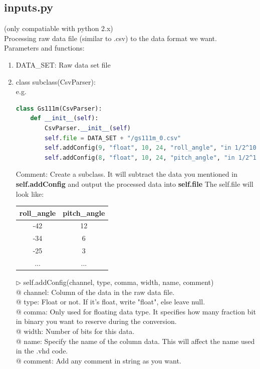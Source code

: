 \subsection{inputs.py}\label{inputs.py}
(only compatiable with python 2.x)\\
Processing raw data file (similar to .csv) to the data format we want.\\
Parameters and functions:
\begin{enumerate}
	\item DATA\_SET: Raw data set file
	\item class subclass(CsvParser): \\
e.g.
\begin{lstlisting}[language=Python]
class Gs111m(CsvParser):
	def __init__(self):
		CsvParser.__init__(self)
		self.file = DATA_SET + "/gs111m_0.csv"
		self.addConfig(9, "float", 10, 24, "roll_angle", "in 1/2^10 rad")
		self.addConfig(8, "float", 10, 24, "pitch_angle", "in 1/2^10 rad")
\end{lstlisting}
Comment: Create a subclass. It will subtract the data you mentioned in \textbf{self.addConfig} and output the processed data into \textbf{self.file}
The self.file will look like:
\begin{center}
\begin{tabular}{ c|c}
 \hline
 roll\_angle & pitch\_angle \\
 \hline
 -42 & 12 \\
 \hline
 -34 & 6\\
 \hline
 -25 & 3\\
 ...&...
\end{tabular}
\end{center}
$\triangleright$ self.addConfig(channel, type, comma, width, name, comment)\\
@ channel: Column of the data in the raw data file.\\
@ type: Float or not. If it's float, write "float", else leave null.\\
@ comma: Only used for floating data type. It specifies how many fraction bit in binary you want to reserve during the conversion.\\
@ width: Number of bits for this data.\\
@ name: Specify the name of the column data. This will affect the name used in the .vhd code.\\
@ comment: Add any comment in string as you want.


\end{enumerate}

